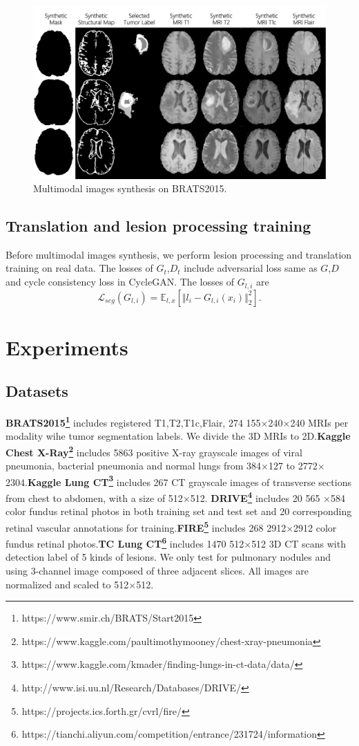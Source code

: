 \documentclass[runningheads]{llncs}
\begin{document}
	\begin{figure}
		\centering
		\includegraphics[width=0.6\linewidth]{figures/F_to_MRI}
		\caption{Multimodal images synthesis on BRATS2015.}
		\label{generated_mri}
	\end{figure}
	\subsection{Translation and lesion processing training}
	Before multimodal images synthesis, we perform lesion processing and translation training on real data. The losses of $G_t$,$D_t$ include adversarial loss same as  $G$,$D$ and cycle consistency loss in CycleGAN.
	The losses of $G_{l,i}$ are 
	\begin{equation}
	\label{lesion segmentation loss}
	\mathcal{L}_{seg}(G_{l,i})=\mathbb{E}_{l,x}[\Vert{l_i-G_{l,i}(x_{i})}\Vert_{2}^{2}].
	\end{equation}
	
	\section{Experiments}
	\subsection{Datasets}
	\textbf{BRATS2015\footnote{https://www.smir.ch/BRATS/Start2015}} includes registered T1,T2,T1c,Flair, 274 155$\times$240$\times$240 MRIs per modality wihe tumor segmentation labels. We divide the 3D MRIs to 2D.\textbf{Kaggle Chest X-Ray\footnote{https://www.kaggle.com/paultimothymooney/chest-xray-pneumonia }} includes 5863 positive X-ray grayscale images of viral pneumonia, bacterial pneumonia and normal lungs from 384$\times$127 to 2772$\times$2304.\textbf{Kaggle Lung CT\footnote{https://www.kaggle.com/kmader/finding-lungs-in-ct-data/data/}} includes 267  CT grayscale images of transverse sections from chest to abdomen, with a size of 512$\times$512. \textbf{DRIVE\footnote{http://www.isi.uu.nl/Research/Databases/DRIVE/}} includes 20 565 $\times $584 color fundus retinal photos in both training set and test set and 20 corresponding retinal vascular annotations for training.\textbf{FIRE\footnote{https://projects.ics.forth.gr/cvrl/fire/}} includes 268 2912$\times$2912 color fundus retinal photos.\textbf{TC Lung CT\footnote{https://tianchi.aliyun.com/competition/entrance/231724/information}} includes 1470 512$\times$512 3D CT scans with detection label of 5 kinds of lesions. We only test for pulmonary nodules and using 3-channel image composed of three adjacent slices. All images are normalized and scaled to 512$\times$512.
	
\end{document}
